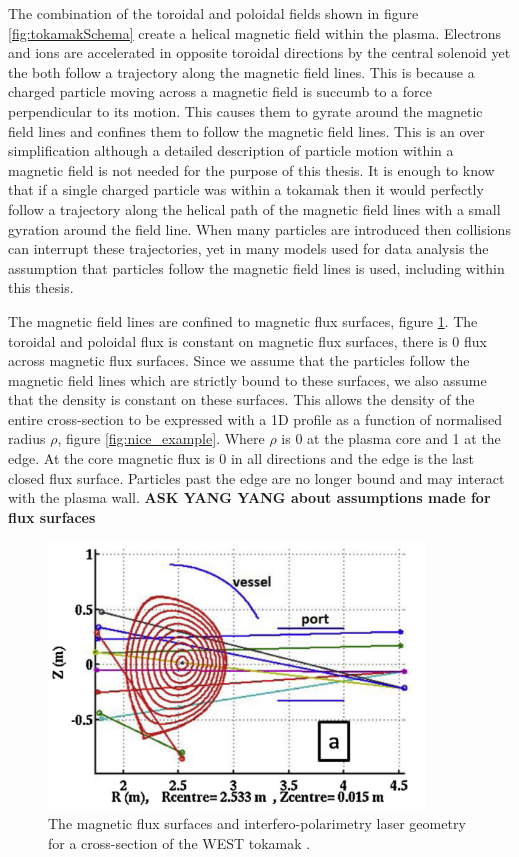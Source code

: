 The combination of the toroidal and poloidal fields shown in figure \ref{fig:tokamakSchema} create a helical magnetic field within the plasma. Electrons and ions are accelerated in opposite toroidal directions by the central solenoid yet the both follow a trajectory along the magnetic field lines. This is because a charged particle moving across a magnetic field is succumb to a force perpendicular to its motion. This causes them to gyrate around the magnetic field lines and confines them to follow the magnetic field lines. This is an over simplification although a detailed description of particle motion within a magnetic field is not needed for the purpose of this thesis. It is enough to know that if a single charged particle was within a tokamak then it would perfectly follow a trajectory along the helical path of the magnetic field lines with a small gyration around the field line. When many particles are introduced then collisions can interrupt these trajectories, yet in many models used for data analysis the assumption that particles follow the magnetic field lines is used, including within this thesis. 

The magnetic field lines are confined to magnetic flux surfaces, figure \ref{fig:magfuxsurf}. The toroidal and poloidal flux is constant on magnetic flux surfaces, there is 0 flux across magnetic flux surfaces. Since we assume that the particles follow the magnetic field lines which are strictly bound to these surfaces, we also assume that the density is constant on these surfaces. This allows the density of the entire cross-section to be expressed with a 1D profile as a function of normalised radius $\rho$, figure \ref{fig:nice_example}. Where $\rho$ is 0 at the plasma core and 1 at the edge. At the core magnetic flux is 0 in all directions and the edge is the last closed flux surface. Particles past the edge are no longer bound and may interact with the plasma wall. \textbf{ASK YANG YANG about assumptions made for flux surfaces} 

\begin{figure}
  \centering
  \includegraphics[width=10cm]{images/magfluxsurf.png}
  \caption{The magnetic flux surfaces and interfero-polarimetry laser geometry for a cross-section of the WEST tokamak \cite{reneintpol}.}
  \label{fig:magfuxsurf}
\end{figure}

